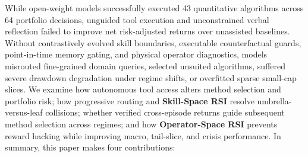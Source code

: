 \documentclass[11pt]{article}
\begin{document}
While open-weight models successfully executed 43 quantitative algorithms across 64 portfolio
decisions, unguided tool execution and unconstrained verbal reflection failed to improve
net risk-adjusted returns over unassisted baselines. Without contrastively evolved skill
boundaries, executable counterfactual guards, point-in-time memory gating, and physical
operator diagnostics, models misrouted fine-grained domain queries, selected unsuited
algorithms, suffered severe drawdown degradation under regime shifts, or overfitted sparse
small-cap slices. We examine how autonomous tool access alters method selection and portfolio
risk; how progressive routing and \textbf{Skill-Space RSI} resolve umbrella-versus-leaf
collisions; whether verified cross-episode returns guide subsequent method selection across
regimes; and how \textbf{Operator-Space RSI} prevents reward hacking while improving macro,
tail-slice, and crisis performance. In summary, this paper makes four contributions:
\end{document}
